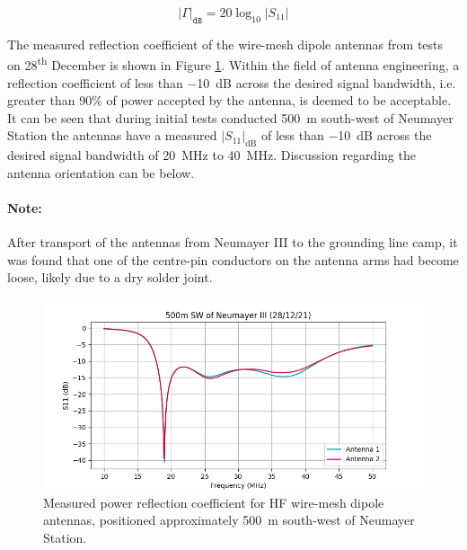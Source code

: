 \documentclass[a4paper,12pt]{article}
\begin{document}
\begin{equation}
  \left|\Gamma\right|_{\texttt{dB}} = 20\log_{10} \left|S_{11}\right|
\end{equation}

The measured reflection coefficient of the wire-mesh dipole antennas from tests
on 28\textsuperscript{th} December is shown in Figure
\ref{FigureWireMeshNeumayer}.  Within the field of antenna engineering, a
reflection coefficient of less than \SI{-10}{\deci\bel} across the desired
signal bandwidth, i.e. greater than 90\% of power accepted by the antenna, is
deemed to be acceptable.  It can be seen that during initial tests conducted
\SI{500}{\metre} south-west of Neumayer Station the antennas have a measured
$\left|S_{11}\right|_{\textrm{dB}}$ of less than \SI{-10}{\deci\bel} across the
desired signal bandwidth of \SI{20}{\mega\hertz} to \SI{40}{\mega\hertz}.
Discussion regarding the antenna orientation can be below.

\paragraph*{Note:} After transport of the antennas from Neumayer III to the
grounding line camp, it was found that one of the centre-pin conductors on the
antenna arms had become loose, likely due to a dry solder joint.

\begin{figure}[htbp]
  \centering
  \includegraphics[width=\textwidth]{Figures/ApRES/Rover/HF/antenna_comparison_s11.png}
  \caption{
    Measured power reflection coefficient for HF wire-mesh dipole antennas, 
    positioned approximately \SI{500}{\metre} south-west of Neumayer Station.
  }
  \label{FigureWireMeshNeumayer}
\end{figure}
\end{document}
